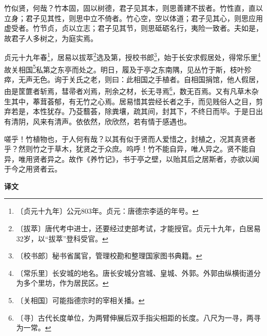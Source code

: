 \documentclass[12pt,UTF-8,openany,a4]{ctexbook}
\begin{document}
\begin{large}
    
    竹似贤，何哉？竹本固，固以树德，君子见其本，则思善建不拔者。竹性直，直以立身；君子见其性，则思中立不倚者。竹心空，空以体道；君子见其心，则思应用虚受者。竹节贞，贞以立志；君子见其节，则思砥砺名行，夷险一致者。夫如是，故君子人多树之，为庭实焉。
    
    贞元十九年春\footnote{〔贞元十九年〕\yiwen 公元803年。贞元：唐德宗李适的年号。}，居易以拔萃\footnote{〔拔萃〕\yiwen 唐代考中进士，还要经过吏部考试，才能授官。贞元十九年，白居易32岁，以“拔萃”登科受官。}选及第，授校书郎\footnote{〔校书郎〕\yiwen 秘书省属官，管理校勘和整理国家图书典籍。}，始于长安求假居处，得常乐里\footnote{〔常乐里〕\yiwen 长安城的地名。唐长安城分宫城、皇城、外郭。外郭由纵横街道分为多个里坊，作为居民区。}故关相国\footnote{〔关相国〕\yiwen 可能指德宗时的宰相关播。}私第之东亭而处之。明日，履及于亭之东南隅，见丛竹于斯，枝叶殄瘁，无声无色。询于关氏之老，则曰：此相国之手植者。自相国捐馆，他人假居，由是筐篚者斩焉，彗帚者刈焉，刑余之材，长无寻焉\footnote{〔寻〕\yiwen 古代长度单位，为两臂伸展后双手指尖相距的长度。八尺为一寻，两寻为一常。}，数无百焉。又有凡草木杂生其中，菶茸荟郁，有无竹之心焉。居易惜其尝经长者之手，而见贱俗人之目，剪弃若是，本性犹存。乃芟蘙荟，除粪壤，疏其间，封其下，不终日而毕。于是日出有清阴，风来有清声。依依然，欣欣然，若有情于感遇也。
    
    嗟乎！竹植物也，于人何有哉？以其有似于贤而人爱惜之，封植之，况其真贤者乎？然则竹之于草木，犹贤之于众庶。呜呼！竹不能自异，唯人异之。贤不能自异，唯用贤者异之。故作《养竹记》，书于亭之壁，以贻其后之居斯者，亦欲以闻于今之用贤者云。
\end{large}


\newpage

\begin{Large}
    \noindent\textbf{译文}
\end{Large}


\vspace{1em}
\end{document}
